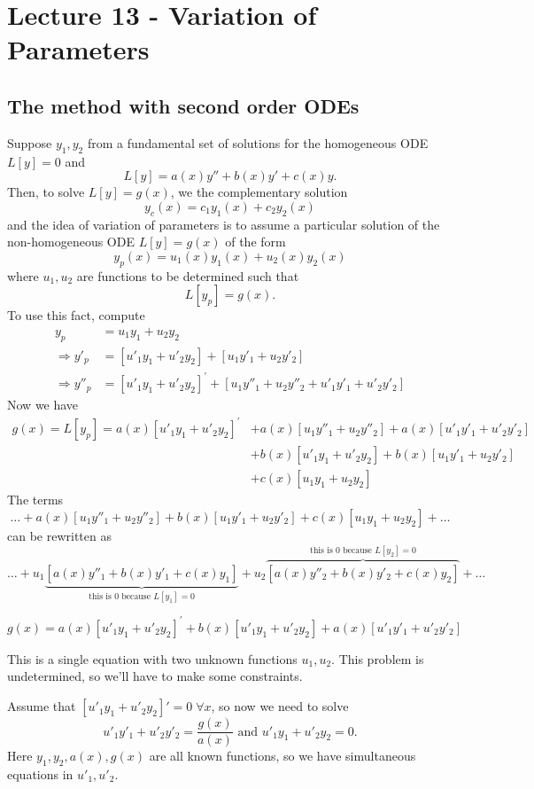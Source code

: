 \documentclass[11pt]{article}
\begin{document}
\section{Lecture 13 - Variation of Parameters}
\subsection{The method with second order ODEs}
	Suppose $y_1, y_2$ from a fundamental set of solutions for the homogeneous ODE $L[y]=0$ and
		$$ L[y] = a(x)y'' + b(x)y' + c(x)y. $$
	Then, to solve $L[y] = g(x)$, we the complementary solution
		$$ y_c (x) = c_1 y_1 (x) + c_2 y_2 (x) $$
	and the idea of variation of parameters is to assume a particular solution of the non-homogeneous ODE $L[y] = g(x)$ of the form
		$$ y_p (x) = u_1 (x) y_1 (x) + u_2 (x) y_2 (x) $$
	where $u_1, u_2$ are functions to be determined such that
		$$ L[y_p] = g(x). $$
	To use this fact, compute
		\begin{align*}
			y_p &= u_1 y_1 + u_2 y_2 \\
			\Rightarrow y'_p &= [u'_1 y_1 + u'_2 y_2] + [u_1 y'_1 + u_2 y'_2] \\
			\Rightarrow y''_p &= [u'_1 y_1 + u'_2 y_2]^{\prime} + [u_1 y''_1 + u_2 y''_2 + u'_1 y'_1 + u'_2 y'_2]
		\end{align*}
	Now we have
		\begin{align*}
			g(x) = L[y_p] = a(x) [u'_1 y_1 + u'_2 y_2]^{\prime} &+ a(x) [u_1 y''_1 + u_2 y''_2] + a(x) [u'_1 y'_1 + u'_2 y'_2] \\
		&+ b(x) [u'_1 y_1 + u'_2 y_2] + b(x) [u_1 y'_1 + u_2 y'_2] \\
		&+ c(x) [u_1 y_1 + u_2 y_2]
		\end{align*}
	The terms
		$$ \ldots + a(x) [u_1 y''_1 + u_2 y''_2] + b(x) [u_1 y'_1 + u_2 y'_2] + c(x) [u_1 y_1 + u_2 y_2] + \ldots $$
	can be rewritten as
		$$ \ldots + u_1 \underbrace{[a(x) y''_1 + b(x) y'_1 + c(x) y_1]}_{ \text{this is } 0 \text{ because } L[y_1] = 0} + u_2 \overbrace{[a(x) y''_2 + b(x) y'_2 + c(x) y_2]}^{\text{this is } 0 \text{ because } L[y_2] = 0} + \ldots $$

		$$ g(x) = a(x) [u'_1 y_1 + u'_2 y_2]^{\prime} + b(x) [u'_1 y_1 + u'_2 y_2] + a(x) [u'_1 y'_1 + u'_2 y'_2] $$

	This is a single equation with two unknown functions $u_1, u_2$. This problem is undetermined, so we'll have to make some constraints.

	Assume that $[u'_1 y_1 + u'_2 y_2]' = 0 \; \forall x$, so now we need to solve
		$$ u'_1 y'_1 + u'_2 y'_2 = \frac{g(x)}{a(x)} \text{ and } u'_1 y_1 + u'_2 y_2 = 0. $$
	Here $y_1,y_2,a(x),g(x)$ are all known functions, so we have simultaneous equations in $u'_1, u'_2$.
\end{document}
